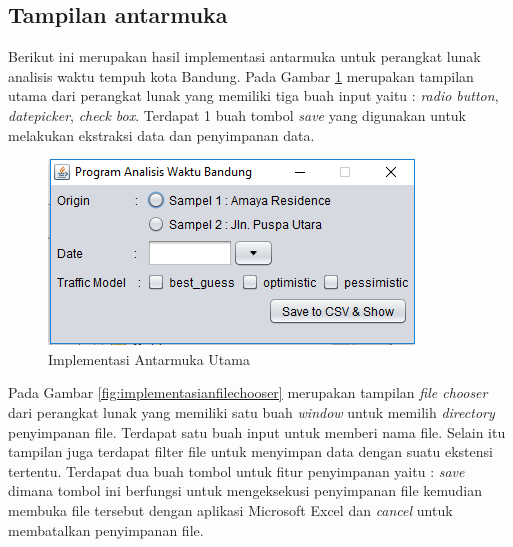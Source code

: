 \subsection{Tampilan antarmuka}
\label{subsec:tampilanantarmuka}

Berikut ini merupakan hasil implementasi antarmuka untuk perangkat lunak analisis waktu tempuh kota Bandung.
Pada Gambar \ref{fig:implementasiantarmukautama} merupakan tampilan utama dari perangkat lunak yang memiliki tiga buah input yaitu : \textit{radio button}, \textit{datepicker}, \textit{check box}. Terdapat 1 buah tombol \textit{save} yang digunakan untuk melakukan ekstraksi data dan penyimpanan data.

\begin{figure}[H]
				\centering		
				\includegraphics[scale=0.7]{Gambar/gui1.png}
				\caption[Implementasi Antarmuka Utama]{Implementasi Antarmuka Utama}
				\label{fig:implementasiantarmukautama}	
			\end{figure}
			
Pada Gambar \ref{fig:implementasianfilechooser} merupakan tampilan \textit{file chooser} dari perangkat lunak yang memiliki satu buah \textit{window} untuk memilih \textit{directory} penyimpanan file. Terdapat satu buah input untuk memberi nama file. Selain itu tampilan juga terdapat filter file untuk menyimpan data dengan suatu ekstensi tertentu. Terdapat dua buah tombol untuk fitur penyimpanan yaitu : \textit{save} dimana tombol ini berfungsi untuk mengeksekusi penyimpanan file kemudian membuka file tersebut dengan aplikasi Microsoft Excel dan \textit{cancel} untuk membatalkan penyimpanan file.

